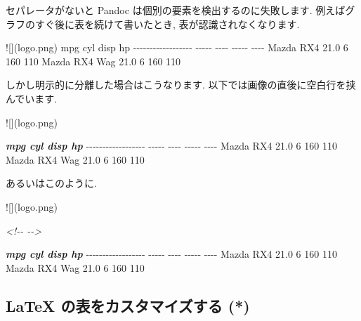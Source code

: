 \documentclass[
  11pt,
]{bxjsreport}
\newenvironment{Shaded}{\begin{snugshade}}{\end{snugshade}}
\newcommand{\AlertTok}[1]{\textcolor[rgb]{0.94,0.16,0.16}{#1}}
\newcommand{\CommentTok}[1]{\textcolor[rgb]{0.56,0.35,0.01}{\textit{#1}}}
\newcommand{\InformationTok}[1]{\textcolor[rgb]{0.56,0.35,0.01}{\textbf{\textit{#1}}}}
\newcommand{\NormalTok}[1]{#1}
\begin{document}
セパレータがないと Pandoc は個別の要素を検出するのに失敗します. 例えばグラフのすぐ後に表を続けて書いたとき, 表が認識されなくなります.

\begin{Shaded}
\begin{Highlighting}[]
\AlertTok{![](logo.png)}
\NormalTok{                      mpg   cyl   disp    hp}
\NormalTok{{-}{-}{-}{-}{-}{-}{-}{-}{-}{-}{-}{-}{-}{-}{-}{-}{-}{-}  {-}{-}{-}{-}{-}  {-}{-}{-}{-}  {-}{-}{-}{-}{-}  {-}{-}{-}{-}}
\NormalTok{Mazda RX4            21.0     6    160   110}
\NormalTok{Mazda RX4 Wag        21.0     6    160   110}
\end{Highlighting}
\end{Shaded}

しかし明示的に分離した場合はこうなります. 以下では画像の直後に空白行を挟んでいます.

\begin{Shaded}
\begin{Highlighting}[]
\AlertTok{![](logo.png)}

\InformationTok{                      mpg   cyl   disp    hp}
\NormalTok{{-}{-}{-}{-}{-}{-}{-}{-}{-}{-}{-}{-}{-}{-}{-}{-}{-}{-}  {-}{-}{-}{-}{-}  {-}{-}{-}{-}  {-}{-}{-}{-}{-}  {-}{-}{-}{-}}
\NormalTok{Mazda RX4            21.0     6    160   110}
\NormalTok{Mazda RX4 Wag        21.0     6    160   110}
\end{Highlighting}
\end{Shaded}

あるいはこのように.

\begin{Shaded}
\begin{Highlighting}[]
\AlertTok{![](logo.png)}

\CommentTok{\textless{}!{-}{-} {-}{-}\textgreater{}}

\InformationTok{                      mpg   cyl   disp    hp}
\NormalTok{{-}{-}{-}{-}{-}{-}{-}{-}{-}{-}{-}{-}{-}{-}{-}{-}{-}{-}  {-}{-}{-}{-}{-}  {-}{-}{-}{-}  {-}{-}{-}{-}{-}  {-}{-}{-}{-}}
\NormalTok{Mazda RX4            21.0     6    160   110}
\NormalTok{Mazda RX4 Wag        21.0     6    160   110}
\end{Highlighting}
\end{Shaded}

\hypertarget{customize-latex-tables}{%
\subsection{LaTeX の表をカスタマイズする (*)}\label{customize-latex-tables}}
\end{document}
